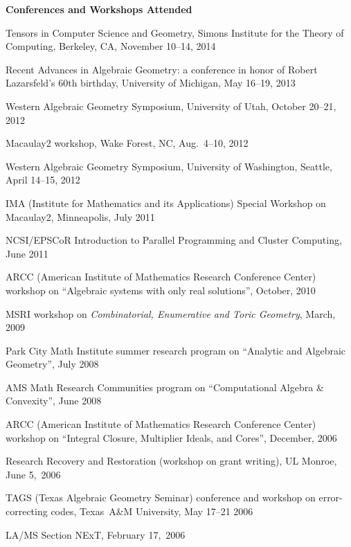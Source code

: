 \documentclass[12pt]{article}
\begin{document}
\textbf{Conferences and Workshops Attended}
\begin{description}
\setlength{}
\item[] Tensors in Computer Science and Geometry, Simons Institute for the Theory of Computing, Berkeley, CA, November 10--14, 2014
\item[] Recent Advances in Algebraic Geometry: a conference in honor of Robert Lazarsfeld's 60th birthday,
University of Michigan, May 16--19, 2013
\item[] Western Algebraic Geometry Symposium, University of Utah, October 20--21, 2012
\item[] Macaulay2 workshop, Wake Forest, NC, Aug.~4--10, 2012
\item[] Western Algebraic Geometry Symposium, University of Washington, Seattle, April 14--15, 2012
\item[] IMA (Institute for Mathematics and its Applications) Special Workshop on Macaulay2, Minneapolis, July 2011
\item[] NCSI/EPSCoR Introduction to Parallel Programming and Cluster Computing, June 2011
\item[] ARCC (American Institute of Mathematics Research Conference Center) workshop on
``Algebraic systems with only real solutions'', October, 2010
\item[] MSRI workshop on \textit{Combinatorial, Enumerative and Toric Geometry}, March, 2009
\item[] Park City Math Institute summer research program on ``Analytic and Algebraic Geometry'', July 2008
\item[] AMS Math Research Communities program on ``Computational Algebra \& Convexity'', June 2008
\item[] ARCC (American Institute of Mathematics Research Conference Center) workshop on 
``Integral Closure, Multiplier Ideals, and Cores'', December, 2006
\item[] Research Recovery and Restoration (workshop on grant writing), UL Monroe, June 5,~2006
\item[] TAGS (Texas Algebraic Geometry Seminar) conference and workshop on error-correcting codes, Texas~A\&M University, May 17--21 2006
\item[] LA/MS Section NExT, February 17,~2006
\end{description}


\end{document}
